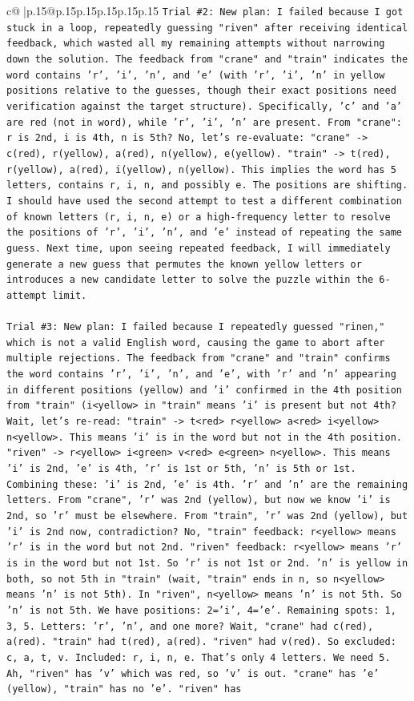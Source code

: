 \documentclass{article}
\begin{document}
{\begin{supertabular}{c@{$\;$}|p{.15\linewidth}@{}p{.15\linewidth}p{.15\linewidth}p{.15\linewidth}p{.15\linewidth}p{.15\linewidth}}
{{{\texttt{Trial \#2: New plan: I failed because I got stuck in a loop, repeatedly guessing "riven" after receiving identical feedback, which wasted all my remaining attempts without narrowing down the solution. The feedback from "crane" and "train" indicates the word contains 'r', 'i', 'n', and 'e' (with 'r', 'i', 'n' in yellow positions relative to the guesses, though their exact positions need verification against the target structure). Specifically, 'c' and 'a' are red (not in word), while 'r', 'i', 'n' are present. From "crane": r is 2nd, i is 4th, n is 5th? No, let's re{-}evaluate: "crane" {-}> c(red), r(yellow), a(red), n(yellow), e(yellow). "train" {-}> t(red), r(yellow), a(red), i(yellow), n(yellow). This implies the word has 5 letters, contains r, i, n, and possibly e. The positions are shifting. I should have used the second attempt to test a different combination of known letters (r, i, n, e) or a high{-}frequency letter to resolve the positions of 'r', 'i', 'n', and 'e' instead of repeating the same guess. Next time, upon seeing repeated feedback, I will immediately generate a new guess that permutes the known yellow letters or introduces a new candidate letter to solve the puzzle within the 6{-}attempt limit.} \\
\\ 
\texttt{Trial \#3: New plan: I failed because I repeatedly guessed "rinen," which is not a valid English word, causing the game to abort after multiple rejections. The feedback from "crane" and "train" confirms the word contains 'r', 'i', 'n', and 'e', with 'r' and 'n' appearing in different positions (yellow) and 'i' confirmed in the 4th position from "train" (i<yellow> in "train" means 'i' is present but not 4th? Wait, let's re{-}read: "train" {-}> t<red> r<yellow> a<red> i<yellow> n<yellow>. This means 'i' is in the word but not in the 4th position. "riven" {-}> r<yellow> i<green> v<red> e<green> n<yellow>. This means 'i' is 2nd, 'e' is 4th, 'r' is 1st or 5th, 'n' is 5th or 1st. Combining these: 'i' is 2nd, 'e' is 4th. 'r' and 'n' are the remaining letters. From "crane", 'r' was 2nd (yellow), but now we know 'i' is 2nd, so 'r' must be elsewhere. From "train", 'r' was 2nd (yellow), but 'i' is 2nd now, contradiction? No, "train" feedback: r<yellow> means 'r' is in the word but not 2nd. "riven" feedback: r<yellow> means 'r' is in the word but not 1st. So 'r' is not 1st or 2nd. 'n' is yellow in both, so not 5th in "train" (wait, "train" ends in n, so n<yellow> means 'n' is not 5th). In "riven", n<yellow> means 'n' is not 5th. So 'n' is not 5th. We have positions: 2='i', 4='e'. Remaining spots: 1, 3, 5. Letters: 'r', 'n', and one more? Wait, "crane" had c(red), a(red). "train" had t(red), a(red). "riven" had v(red). So excluded: c, a, t, v. Included: r, i, n, e. That's only 4 letters. We need 5. Ah, "riven" has 'v' which was red, so 'v' is out. "crane" has 'e' (yellow), "train" has no 'e'. "riven" has} \\
}}}
\end{supertabular}}
\end{document}
